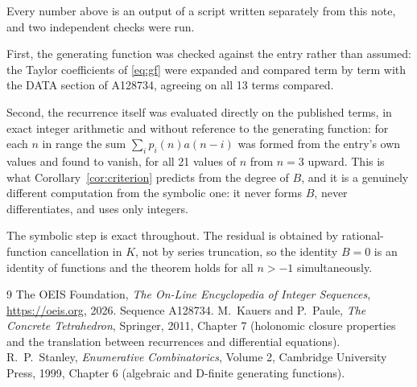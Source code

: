 \documentclass[11pt,a4paper]{article}
\theoremstyle{plain}
\theoremstyle{definition}
\begin{document}
Every number above is an output of a script written separately from this note, and two
independent checks were run.

First, the generating function was checked against the entry rather than assumed: the
Taylor coefficients of \eqref{eq:gf} were expanded and compared term by term with the DATA
section of A128734, agreeing on all 13 terms compared.

Second, the recurrence itself was evaluated directly on the published terms, in exact
integer arithmetic and without reference to the generating function: for each $n$ in range
the sum $\sum_{i}p_{i}(n)a(n-i)$ was formed from the entry's own values and found to
vanish, for all 21 values of $n$ from $n=3$ upward. This is what
Corollary~\ref{cor:criterion} predicts from the degree of $B$, and it is a genuinely
different computation from the symbolic one: it never forms $B$, never differentiates, and
uses only integers.

The symbolic step is exact throughout. The residual is obtained by rational-function
cancellation in $K$, not by series truncation, so the identity $B=0$ is an
identity of functions and the theorem holds for all $n>-1$ simultaneously.

\begin{thebibliography}{9}
 The OEIS Foundation, \emph{The On-Line Encyclopedia of Integer Sequences},
\url{https://oeis.org}, 2026. Sequence A128734.
 M.~Kauers and P.~Paule, \emph{The Concrete Tetrahedron}, Springer, 2011,
Chapter 7 (holonomic closure properties and the translation between recurrences and
differential equations).
 R.~P.~Stanley, \emph{Enumerative Combinatorics}, Volume 2, Cambridge
University Press, 1999, Chapter 6 (algebraic and D-finite generating functions).
\end{thebibliography}
\end{document}

